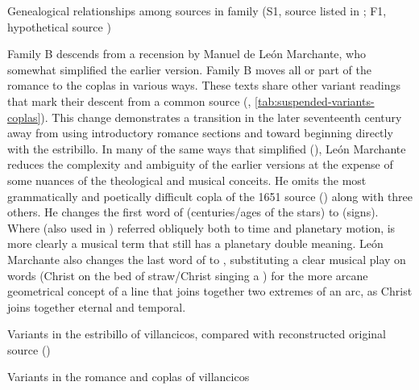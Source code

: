 
{Genealogical relationships among sources in  family
(S1, source listed in ; F1, hypothetical source
)}

Family B descends from a recension by Manuel de León Marchante, who somewhat
simplified the earlier version.%
    \Autocite{LeonMarchante:Obras1733} %
Family B moves all or part of the romance to the coplas in various ways.
These texts share other variant readings that mark their descent from a common
source (, 
\ref{tab:suspended-variants-coplas}).
This change demonstrates a transition in the later seventeenth century away from
using introductory romance sections and toward beginning directly with
the estribillo.%
    \Autocite{Torrente:Estribillo}
In many of the same ways that  simplified
 (), León Marchante
reduces the complexity and ambiguity of the earlier versions at the expense of
some nuances of the theological and musical conceits.
He omits the most grammatically and poetically difficult copla of the 1651
source () along with three others.
He changes the first word of  (centuries/ages of
the stars) to  (signs). 
Where  (also used in ) referred obliquely both to
time and planetary motion,  is more clearly a musical term that
still has a planetary double meaning.
León Marchante also changes the last word of 
to , substituting a clear musical play on words (Christ
 on the bed of straw/Christ singing a ) for the
more arcane geometrical concept of a line that joins together two extremes of
an arc, as Christ joins together eternal and temporal.


{Variants in the estribillo of  villancicos,
compared with reconstructed original source ()}

{Variants in the romance and coplas of  villancicos}

